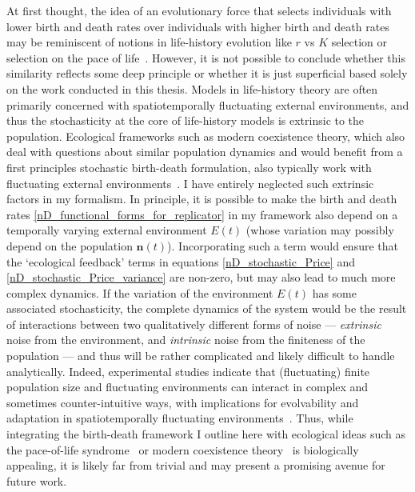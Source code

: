 At first thought, the idea of an evolutionary force that selects individuals with lower birth and death rates over individuals with higher birth and death rates may be reminiscent of notions in life-history evolution like $r$ vs $K$ selection or selection on the pace of life~\citep{stearns_evolution_1977}. However, it is not possible to conclude whether this similarity reflects some deep principle or whether it is just superficial based solely on the work conducted in this thesis. Models in life-history theory are often primarily concerned with spatiotemporally fluctuating external environments, and thus the stochasticity at the core of life-history models is extrinsic to the population. Ecological frameworks such as modern coexistence theory, which also deal with questions about similar population dynamics and would benefit from a first principles stochastic birth-death formulation, also typically work with fluctuating external environments~\citep{chesson_stabilizing_1982,chesson_multispecies_1994}. I have entirely neglected such extrinsic factors in my formalism. In principle, it is possible to make the birth and death rates \eqref{nD_functional_forms_for_replicator} in my framework also depend on a temporally varying external environment $E(t)$ (whose variation may possibly depend on the population $\mathbf{n}(t)$). Incorporating such a term would ensure that the `ecological feedback' terms in equations \eqref{nD_stochastic_Price} and \eqref{nD_stochastic_Price_variance} are non-zero, but may also lead to much more complex dynamics. If the variation of the environment $E(t)$ has some associated stochasticity, the complete dynamics of the system would be the result of interactions between two qualitatively different forms of noise --- \emph{extrinsic} noise from the environment, and \emph{intrinsic} noise from the finiteness of the population --- and thus will be rather complicated and likely difficult to handle analytically. Indeed, experimental studies indicate that (fluctuating) finite population size and fluctuating environments can interact in complex and sometimes counter-intuitive ways, with implications for evolvability and adaptation in spatiotemporally fluctuating environments~\citep{chavhan_larger_2020, chavhan_interplay_2021}. Thus, while integrating the birth-death framework I outline here with ecological ideas such as the pace-of-life syndrome~\citep{mathot_models_2018, wright_life-history_2019} or modern coexistence theory~\citep{chesson_multispecies_1994, johnson_resolving_2022} is biologically appealing, it is likely far from trivial and may present a promising avenue for future work.

